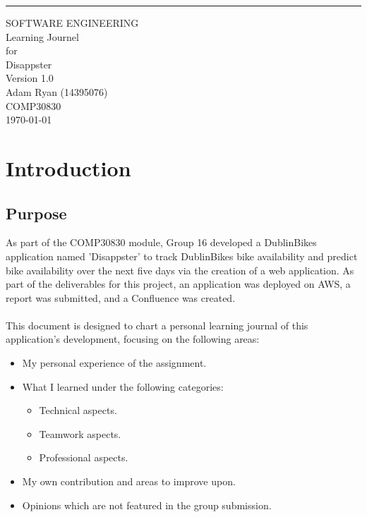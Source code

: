 \documentclass{scrreprt}
\date{}
\def\myversion{1.0 }
\begin{document}
\begin{flushright}
    \rule{16cm}{5pt}\vskip1cm
    \begin{bfseries}
        \Huge{SOFTWARE ENGINEERING \\ Learning Journel}\\
        \vspace{1.9cm}
        for\\
        \vspace{1.9cm}
        Disappster\\
        \vspace{1.9cm}
        \LARGE{Version \myversion}\\
        \vspace{1.9cm}
        Adam Ryan (14395076)\\
        \vspace{1.9cm}
        COMP30830\\
        \vspace{1.9cm}
        \today\\
    \end{bfseries}
\end{flushright}

\tableofcontents

\chapter{Introduction}\label{Intro}

\section{Purpose}\label{Purpose}
As part of the COMP30830 module, Group 16 developed a DublinBikes application named 'Disappster' to track DublinBikes bike availability and predict bike availability over the next five days via the creation of a web application. As part of the deliverables for this project, an application was deployed on AWS, a report was submitted, and a Confluence was created.\\
\\
This document is designed to chart a personal learning journal of this application's development, focusing on the following areas:

\begin{itemize}
	\item My personal experience of the assignment.
	\item What I learned under the following categories:
		\begin{itemize}
			\item Technical aspects.
			\item Teamwork aspects.
			\item Professional aspects.
		\end{itemize}
	\item My own contribution and areas to improve upon.
	\item Opinions which are not featured in the group submission.
	\end{itemize}
\end{document}
